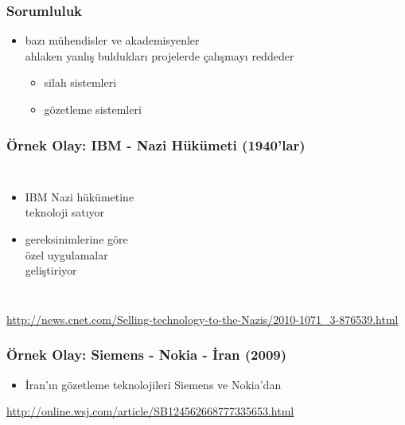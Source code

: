 \documentclass[dvipsnames]{beamer}
\theoremstyle{definition}
\theoremstyle{example}
\theoremstyle{plain}
\begin{document}
\begin{frame}
  \frametitle{Sorumluluk}

  \begin{itemize}
    \item bazı mühendisler ve akademisyenler\\
      ahlaken yanlış buldukları projelerde çalışmayı reddeder
    \begin{itemize}
      \item silah sistemleri
      \item gözetleme sistemleri
    \end{itemize}
  \end{itemize}
\end{frame}

\begin{frame}
  \frametitle{Örnek Olay: IBM - Nazi Hükümeti (1940'lar)}

  \begin{columns}

    \begin{itemize}
      \item IBM Nazi hükümetine\\
        teknoloji satıyor
      \item gereksinimlerine göre\\
        özel uygulamalar\\
        geliştiriyor
    \end{itemize}
  \end{columns}

  \medskip
  \tiny{\url{http://news.cnet.com/Selling-technology-to-the-Nazis/2010-1071_3-876539.html}}
\end{frame}

\begin{frame}
  \frametitle{Örnek Olay: Siemens - Nokia - İran (2009)}

  \begin{center}
  \end{center}

  \begin{itemize}
    \item İran'ın gözetleme teknolojileri Siemens ve Nokia'dan
  \end{itemize}

  \medskip
  \tiny{\url{http://online.wsj.com/article/SB124562668777335653.html}}
\end{frame}
\end{document}
